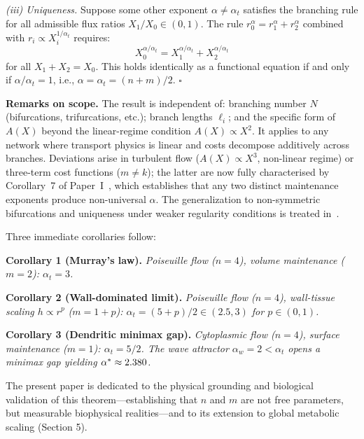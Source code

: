 \documentclass[11pt,a4paper]{article}
\theoremstyle{remark}
\begin{document}
\textit{(iii) Uniqueness.} Suppose some other exponent $\alpha \neq \alpha_t$ satisfies the branching rule for all admissible flux ratios $X_1/X_0 \in (0,1)$. The rule $r_0^\alpha = r_1^\alpha + r_2^\alpha$ combined with $r_i \propto X_i^{1/\alpha_t}$ requires:
\begin{equation*}
X_0^{\alpha/\alpha_t} = X_1^{\alpha/\alpha_t} + X_2^{\alpha/\alpha_t}
\end{equation*}
for all $X_1 + X_2 = X_0$. This holds identically as a functional equation if
and only if $\alpha/\alpha_t = 1$, i.e., $\alpha = \alpha_t = (n+m)/2$.
$\square$

\vspace{0.5em}
\noindent\textbf{Remarks on scope.} The result is independent of: branching number $N$ (bifurcations, trifurcations, etc.); branch lengths $\ell_i$; and the specific form of $A(X)$ beyond the linear-regime condition $A(X) \propto X^2$. It applies to any network where transport physics is linear and costs decompose additively across branches. Deviations arise in turbulent flow ($A(X) \propto X^3$, non-linear regime) or three-term cost functions ($m \neq k$); the latter are now fully characterised by Corollary~7 of Paper~I~\cite{paperI}, which establishes that any two distinct maintenance exponents produce non-universal $\alpha$. The generalization to non-symmetric bifurcations and uniqueness under weaker regularity conditions is treated in~\cite{bennett2025}.

\vspace{0.5em}
Three immediate corollaries follow:

\vspace{0.5em}
\noindent \textbf{Corollary 1 (Murray's law).} \textit{Poiseuille flow ($n=4$), volume maintenance ($m=2$): $\alpha_t = 3$.}

\vspace{0.5em}
\noindent \textbf{Corollary 2 (Wall-dominated limit).} \textit{Poiseuille flow ($n=4$), wall-tissue scaling $h \propto r^p$ ($m=1+p$): $\alpha_t = (5+p)/2 \in (2.5, 3)$ for $p \in (0,1)$.}

\vspace{0.5em}
\noindent \textbf{Corollary 3 (Dendritic minimax gap).} \textit{Cytoplasmic flow ($n=4$), surface maintenance ($m=1$): $\alpha_t = 5/2$. The wave attractor $\alpha_w = 2 < \alpha_t$ opens a minimax gap yielding $\alpha^* \approx 2.380{}$.}
\vspace{0.5em}

The present paper is dedicated to the physical grounding and biological
validation of this theorem---establishing that $n$ and $m$ are not free
parameters, but measurable biophysical realities---and to its extension to
global metabolic scaling (Section 5).
\end{document}
